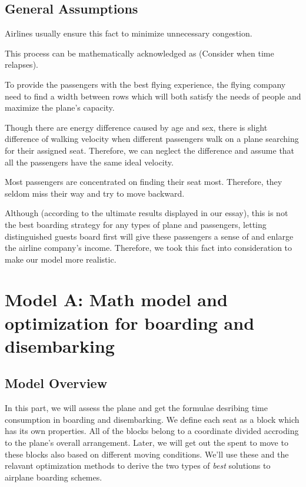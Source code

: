 \documentclass{article}
\theoremstyle{definition}
\theoremstyle{remark}
\numberwithin{equation}{section}
\begin{document}
	\subsection{General Assumptions}
	\begin{enumerate}
		
		Airlines usually ensure this fact to minimize unnecessary congestion.
		
		This process can be mathematically acknowledged as  (Consider when time relapses).
		
		To provide the passengers with the best flying experience, the flying company need to find a width between rows which will both satisfy the needs of people and maximize the plane's capacity.
		
		Though there are energy difference caused by age and sex, there is slight difference of walking velocity when different passengers walk on a plane searching for their assigned seat. Therefore, we can neglect the difference and assume that all the passengers have the same ideal velocity.
		
		Most passengers are concentrated on finding their seat most. Therefore, they seldom miss their way and try to move backward.

		Although (according to the ultimate results displayed in our essay), this is not the best boarding strategy for any types of plane and passengers, letting distinguished guests board first will give these passengers a sense of  and enlarge the airline company's income. Therefore, we took this fact into consideration to make our model more realistic.
	\end{enumerate}
	\section{Model A: Math model and optimization for boarding and disembarking}
	\subsection{Model Overview}
	In this part, we will assess the plane and get the formulae desribing time consumption in boarding and disembarking. We define each seat as a block which has its own properties. All of the blocks belong to a coordinate divided accroding to the plane's overall arrangement. Later, we will get out the spent to move to these blocks also based on different moving conditions. We'll use these and the relavant optimization methods to derive the two types of \textit{best} solutions to airplane boarding schemes.
\end{document}
